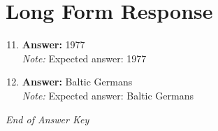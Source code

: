 \documentclass[12pt]{article}
\begin{document}
\section*{Long Form Response}
\begin{enumerate}[label=\arabic*.]
\setcounter{enumi}{10}
\item \textbf{Answer:} 1977
\\ \textit{Note:} Expected answer: 1977
\item \textbf{Answer:} Baltic Germans
\\ \textit{Note:} Expected answer: Baltic Germans
\end{enumerate}

\vfill
\noindent\textit{End of Answer Key}
\end{document}
